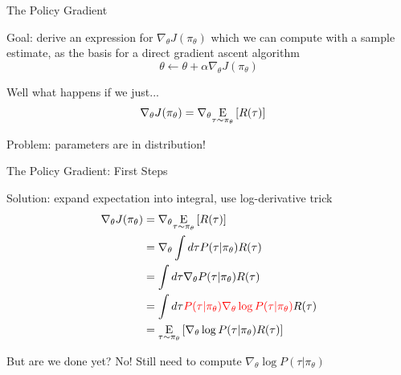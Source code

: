 \documentclass[9pt]{beamer}
\newcommand{\underE}[2]{\underset{\begin{subarray}{c}#1 \end{subarray}}{\E}\left[ #2 \right]}
\begin{document}
\begin{frame}{The Policy Gradient}

Goal: derive an expression for $\nabla_{\theta} J(\pi_{\theta})$ which we can compute with a sample estimate, as the basis for a direct gradient ascent algorithm
%
\begin{equation*}
\theta \leftarrow \theta + \alpha \nabla_{\theta} J(\pi_{\theta})
\end{equation*}

\pause
\vspace{1em}

Well what happens if we just...
%
\begin{align*}
\nabla_{\theta} J(\pi_{\theta}) &= \nabla_{\theta} \underE{\tau \sim \pi_{\theta}}{R(\tau)}
\end{align*}

Problem: parameters are in distribution!

\end{frame}

\begin{frame}{The Policy Gradient: First Steps}

Solution: expand expectation into integral, use log-derivative trick
%
\begin{align*}
\nabla_{\theta} J(\pi_{\theta}) &= \nabla_{\theta} \underE{\tau \sim \pi_{\theta}}{R(\tau)} \\
&= \nabla_{\theta} \int d\tau P(\tau | \pi_{\theta}) R(\tau) \\
&= \int d\tau \nabla_{\theta} P(\tau | \pi_{\theta}) R(\tau) \\
&= \int d\tau {\color{red} P(\tau | \pi_{\theta}) \nabla_{\theta} \log P(\tau | \pi_{\theta})} R(\tau) \\
&= \underE{\tau \sim \pi_{\theta}}{\nabla_{\theta} \log P(\tau | \pi_{\theta}) R(\tau) }
\end{align*}

But are we done yet? No! Still need to compute $\nabla_{\theta} \log P(\tau | \pi_{\theta})$

\end{frame}
\end{document}
